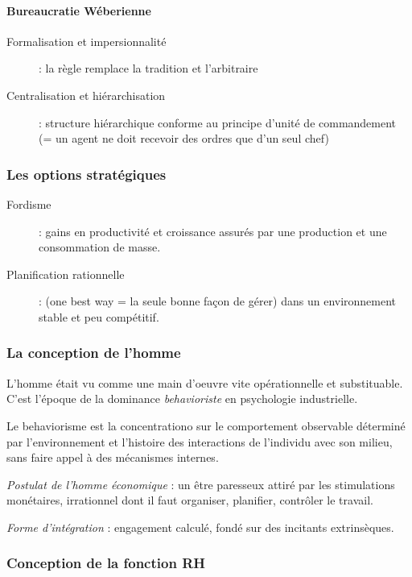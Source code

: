 \documentclass[12pt]{article}
\begin{document}
	  \paragraph{Bureaucratie Wéberienne}
	  \begin{description}
	   \item[Formalisation et impersionnalité] : la règle remplace la tradition et l'arbitraire
	   \item[Centralisation et hiérarchisation] : structure hiérarchique conforme au principe d'unité de commandement (= un agent ne doit recevoir des ordres que d'un seul chef)
	  \end{description}
	  
	  \subsubsection{Les options stratégiques}
	  \begin{description}
	   \item[Fordisme] : gains en productivité et croissance assurés par une production et une consommation de masse.
	   \item[Planification rationnelle] : (one best way = la seule bonne façon de gérer) dans un environnement stable et peu compétitif. 
	  \end{description}

	  \subsubsection{La conception de l'homme}
	  
	  L'homme était vu comme une main d'oeuvre vite opérationnelle et substituable. C'est l'époque de la dominance \textit{behavioriste} en psychologie industrielle.
	  
	  Le behaviorisme est la concentrationo sur le comportement observable déterminé par l'environnement et l'histoire des interactions de l'individu avec son milieu, sans faire appel à des mécanismes internes.
	  
	  \emph{Postulat de l'homme économique} : un être paresseux attiré par les stimulations monétaires, irrationnel dont il faut organiser, planifier, contrôler le travail.
	  
	  \emph{Forme d'intégration} : engagement calculé, fondé sur des incitants extrinsèques.
	  
	  \subsubsection{Conception de la fonction RH}
	  
\end{document}
